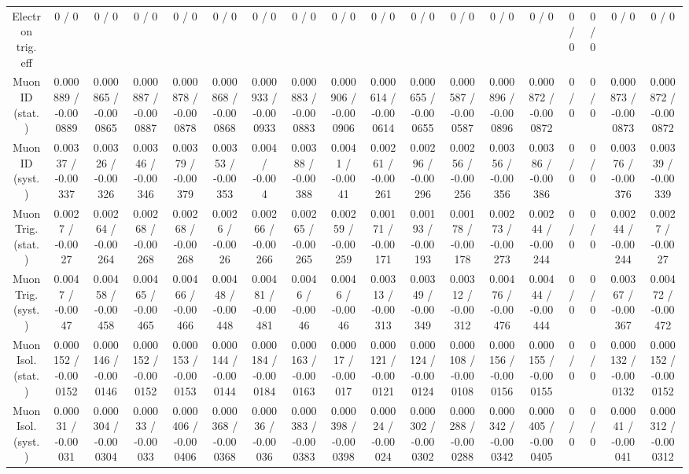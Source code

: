 \documentclass[10pt]{article}
\begin{document}
\begin{table}[htbp]
\begin{center}
\begin{tabular}{|c|c|c|c|c|c|c|c|c|c|c|c|c|c|c|c|c|c|}
  Electron trig. eff & 0 / 0 & 0 / 0 & 0 / 0 & 0 / 0 & 0 / 0 & 0 / 0 & 0 / 0 & 0 / 0 & 0 / 0 & 0 / 0 & 0 / 0 & 0 / 0 & 0 / 0 & 0 / 0 & 0 / 0 & 0 / 0 & 0 / 0 \\ 
  Muon ID (stat.) & 0.000889 / -0.000889 & 0.000865 / -0.000865 & 0.000887 / -0.000887 & 0.000878 / -0.000878 & 0.000868 / -0.000868 & 0.000933 / -0.000933 & 0.000883 / -0.000883 & 0.000906 / -0.000906 & 0.000614 / -0.000614 & 0.000655 / -0.000655 & 0.000587 / -0.000587 & 0.000896 / -0.000896 & 0.000872 / -0.000872 & 0 / 0 & 0 / 0 & 0.000873 / -0.000873 & 0.000872 / -0.000872 \\ 
  Muon ID (syst.) & 0.00337 / -0.00337 & 0.00326 / -0.00326 & 0.00346 / -0.00346 & 0.00379 / -0.00379 & 0.00353 / -0.00353 & 0.004 / -0.004 & 0.00388 / -0.00388 & 0.0041 / -0.0041 & 0.00261 / -0.00261 & 0.00296 / -0.00296 & 0.00256 / -0.00256 & 0.00356 / -0.00356 & 0.00386 / -0.00386 & 0 / 0 & 0 / 0 & 0.00376 / -0.00376 & 0.00339 / -0.00339 \\ 
  Muon Trig. (stat.) & 0.0027 / -0.0027 & 0.00264 / -0.00264 & 0.00268 / -0.00268 & 0.00268 / -0.00268 & 0.0026 / -0.0026 & 0.00266 / -0.00266 & 0.00265 / -0.00265 & 0.00259 / -0.00259 & 0.00171 / -0.00171 & 0.00193 / -0.00193 & 0.00178 / -0.00178 & 0.00273 / -0.00273 & 0.00244 / -0.00244 & 0 / 0 & 0 / 0 & 0.00244 / -0.00244 & 0.0027 / -0.0027 \\ 
  Muon Trig. (syst.) & 0.0047 / -0.0047 & 0.00458 / -0.00458 & 0.00465 / -0.00465 & 0.00466 / -0.00466 & 0.00448 / -0.00448 & 0.00481 / -0.00481 & 0.0046 / -0.0046 & 0.0046 / -0.0046 & 0.00313 / -0.00313 & 0.00349 / -0.00349 & 0.00312 / -0.00312 & 0.00476 / -0.00476 & 0.00444 / -0.00444 & 0 / 0 & 0 / 0 & 0.00367 / -0.00367 & 0.00472 / -0.00472 \\ 
  Muon Isol. (stat.) & 0.000152 / -0.000152 & 0.000146 / -0.000146 & 0.000152 / -0.000152 & 0.000153 / -0.000153 & 0.000144 / -0.000144 & 0.000184 / -0.000184 & 0.000163 / -0.000163 & 0.00017 / -0.00017 & 0.000121 / -0.000121 & 0.000124 / -0.000124 & 0.000108 / -0.000108 & 0.000156 / -0.000156 & 0.000155 / -0.000155 & 0 / 0 & 0 / 0 & 0.000132 / -0.000132 & 0.000152 / -0.000152 \\ 
  Muon Isol. (syst.) & 0.00031 / -0.00031 & 0.000304 / -0.000304 & 0.00033 / -0.00033 & 0.000406 / -0.000406 & 0.000368 / -0.000368 & 0.00036 / -0.00036 & 0.000383 / -0.000383 & 0.000398 / -0.000398 & 0.00024 / -0.00024 & 0.000302 / -0.000302 & 0.000288 / -0.000288 & 0.000342 / -0.000342 & 0.000405 / -0.000405 & 0 / 0 & 0 / 0 & 0.00041 / -0.00041 & 0.000312 / -0.000312 \\ 

\end{tabular}
\end{center}
\end{table}
\end{document}

